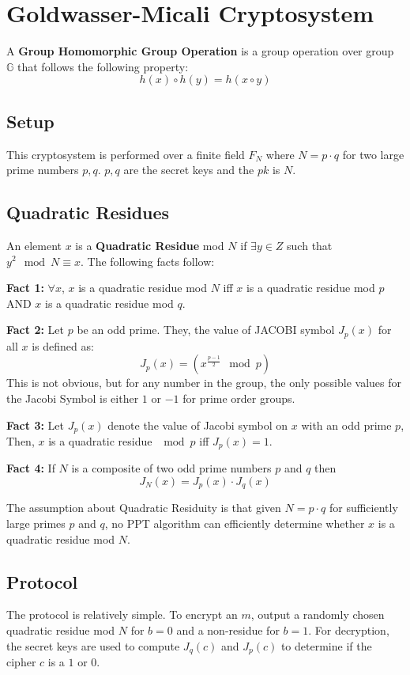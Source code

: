 \documentclass[11pt]{article}
\begin{document}
\section{Goldwasser-Micali Cryptosystem}
A \textbf{Group Homomorphic Group Operation} is a group operation over group $\mathbb{G}$ that follows the following property:
$$h(x) \circ h(y) = h(x \circ y)$$

\subsection{Setup}
This cryptosystem is performed over a finite field $F_N$ where $N = p \cdot q$ for two large prime numbers $p,q$. $p,q$ are the secret keys and the $pk$ is $N$.

\subsection{Quadratic Residues}
An element $x$ is a \textbf{Quadratic Residue} mod $N$ if $\exists y \in Z$ such that $y^2 \mod N \equiv x$. The following facts follow:
\vspace{1em}

\textbf{Fact 1:} $\forall x$, $x$ is a quadratic residue mod $N$ iff $x$ is a quadratic residue mod $p$ AND $x$ is a quadratic residue mod $q$.
\bigskip

\textbf{Fact 2:} Let $p$ be an odd prime. They, the value of JACOBI symbol $J_p(x)$ for all $x$ is defined as:
$$J_p(x) = (x^{\frac{p-1}{2}} \mod p)$$
This is not obvious, but for any number in the group, the only possible values for the Jacobi Symbol is either $1$ or $-1$ for prime order groups.
\bigskip

\textbf{Fact 3:} Let $J_p(x)$ denote the value of Jacobi symbol on $x$ with an odd prime $p$, Then, $x$ is a quadratic residue $\mod p$ iff $J_p(x) = 1$.
\bigskip

\textbf{Fact 4:} If $N$ is a composite of two odd prime numbers $p$ and $q$ then
$$J_N(x) = J_p(x) \cdot J_q(x)$$
\bigskip

The assumption about Quadratic Residuity is that given $N=p \cdot q$ for sufficiently large primes $p$ and $q$, no PPT algorithm can efficiently determine whether $x$ is a quadratic residue mod $N$.

\subsection{Protocol}
The protocol is relatively simple. To encrypt an $m$, output a randomly chosen quadratic residue mod $N$ for $b=0$ and a non-residue for $b=1$. For decryption, the secret keys are used to compute $J_q(c)$ and $J_p(c)$ to determine if the cipher $c$ is a $1$ or $0$.
\bigskip
\end{document}
